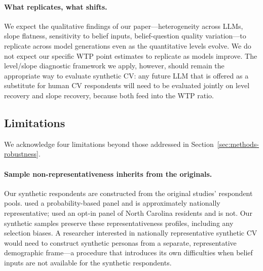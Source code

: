 \documentclass[12pt]{article}
\begin{document}
\paragraph{What replicates, what shifts.} We expect the qualitative
findings of our paper---heterogeneity across LLMs, slope flatness,
sensitivity to belief inputs, belief-question quality variation---to
replicate across model generations even as the quantitative levels
evolve. We do not expect our specific WTP point estimates to replicate
as models improve. The level/slope diagnostic framework we apply,
however, should remain the appropriate way to evaluate synthetic CV:
any future LLM that is offered as a substitute for human CV respondents
will need to be evaluated jointly on level recovery and slope recovery,
because both feed into the WTP ratio.

\subsection{Limitations}\label{sec:disc-limitations}

We acknowledge four limitations beyond those addressed in
Section~\ref{sec:methods-robustness}.

\paragraph{Sample non-representativeness inherits from the originals.}
Our synthetic respondents are constructed from the original studies'
respondent pools. \textcite{Aldy2012} used a probability-based panel
and is approximately nationally representative; \textcite{Giguere2020}
used an opt-in panel of North Carolina residents and is not. Our
synthetic samples preserve these representativeness profiles, including
any selection biases. A researcher interested in nationally
representative synthetic CV would need to construct synthetic personas
from a separate, representative demographic frame---a procedure that
introduces its own difficulties when belief inputs are not available
for the synthetic respondents.
\end{document}
